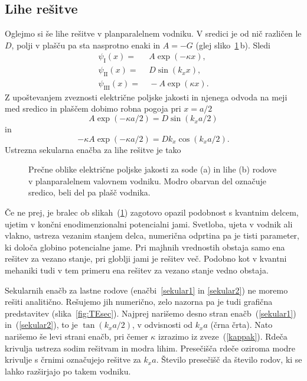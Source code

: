 \subsection*{Lihe rešitve}
Oglejmo si še lihe rešitve v planparalelnem vodniku. V sredici je od nič različen
le $D$, polji v plašču pa sta nasprotno enaki in $A = -G$ (glej sliko~\ref{fig:TESodi}\,b). Sledi
\begin{align}
\psi_{\mathrm{I}}(x) =&~ A \exp(-\kappa x),\\
\psi_{\mathrm{II}}(x) =&~ D \sin(k_x x),\\
\psi_{\mathrm{III}}(x) =&~ -A \exp(\kappa x).
\end{align}
Z upoštevanjem zveznosti električne poljske jakosti in njenega odvoda na 
meji med sredico in plaščem dobimo robna pogoja pri $x=a/2$
\begin{equation}
A \exp(-\kappa a/2) = D \sin(k_x a/2)
\end{equation}
in 
\begin{equation}
-\kappa A \exp(-\kappa a/2) = D k_x \cos(k_x a/2).
\end{equation}
Ustrezna sekularna enačba za lihe rešitve je tako
\begin{figure}[h]
\centering
\def\svgwidth{140truemm} 
 
\caption{Prečne oblike električne poljske jakosti za sode (a) in lihe (b) rodove v 
planparalelnem valovnem vodniku. Modro obarvan del označuje sredico, beli del pa plašč vodnika. 
}
\label{fig:TESodi}
\end{figure}

\begin{remark}
Če ne prej, je bralec ob slikah~(\ref{fig:TESodi}) zagotovo opazil podobnost s kvantnim delcem, ujetim
v končni enodimenzionalni potencialni jami. Svetloba, ujeta v vodnik ali vlakno, ustreza vezanim stanjem delca,
numerična odprtina pa je tisti parameter, ki določa globino potencialne jame. Pri majhnih vrednostih 
obstaja samo ena rešitev za vezano stanje, pri globlji jami je rešitev več. Podobno kot v kvantni mehaniki
tudi v tem primeru ena rešitev za vezano stanje vedno obstaja. 
\end{remark}

Sekularnih enačb za lastne rodove (enačbi~\ref{sekular1} in \ref{sekular2}) ne moremo rešiti 
analitično. Rešujemo jih numerično, zelo nazorna pa je tudi grafična predstavitev (slika~\ref{fig:TEsec}). 
Najprej narišemo desno stran enačb~(\ref{sekular1}) in~(\ref{sekular2}), to je $\tan (k_x a/2)$, v odvisnosti
od $k_xa$ (črna črta). Nato narišemo še levi strani enačb, pri čemer $\kappa$ izrazimo iz zveze~(\ref{kappak}).
Rdeča krivulja ustreza sodim rešitvam in modra lihim. Presečišča rdeče oziroma modre krivulje s črnimi
označujejo rešitve za $k_xa$. Število presečišč da število rodov, ki se lahko razširjajo po takem vodniku. 

